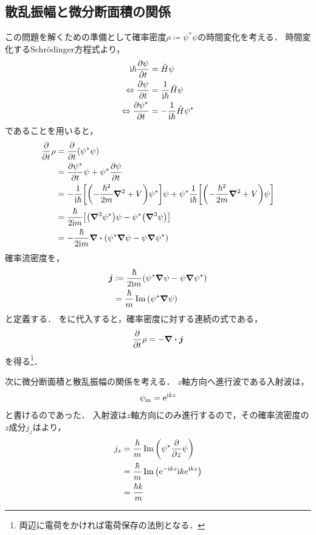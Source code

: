 \documentclass{report}
\begin{document}
  \subsection{散乱振幅と微分断面積の関係}
    この問題を解くための準備として確率密度$\rho \coloneqq \psi^{*} \psi$の時間変化を考える．
    時間変化するSchr\"odinger方程式より，
    \begin{align}
      \mathrm{i}\hbar\pdv{\psi}{t} &= \hat{H}\psi \\ 
      \Leftrightarrow \pdv{\psi}{t} &= \frac{1}{\mathrm{i}\hbar}\hat{H}\psi \\ 
      \Leftrightarrow \pdv{\psi^*}{t} &= -\frac{1}{\mathrm{i}\hbar}\hat{H}\psi^*
    \end{align}
    であることを用いると，
    \begin{align}
      \pdv{t}\rho &= \pdv{t}(\psi^{*}\psi) \\
      &= \pdv{\psi^*}{t}\psi + \psi^{*}\pdv{\psi}{t} \\
      &= -\frac{1}{\mathrm{i}\hbar}\qty[\qty(-\frac{\hbar^2}{2m}\grad^2 + V)\psi^{*}]\psi + \psi^{*}\frac{1}{\mathrm{i}\hbar}\qty[\qty(-\frac{\hbar^2}{2m}\grad^2 + V)\psi] \\
      &= \frac{\hbar}{2\mathrm{i} m}\qty[\qty(\grad^2 \psi^{*})\psi - \psi^{*}\qty(\grad^2\psi)] \\
      &= -\frac{\hbar}{2\mathrm{i} m}\div \qty(\psi^{*}\grad\psi - \psi \grad\psi^{*})\label{prob-density}
    \end{align}
    確率流密度を，
    \begin{align}
      \bm{j} &\coloneqq \frac{\hbar}{2\mathrm{i} m} \qty(\psi^{*}\grad\psi - \psi \grad\psi^{*})\label{prob-flow} \\
      &= \frac{\hbar}{m}\Im \qty(\psi^{*}\grad\psi)
    \end{align}
    と定義する．
    をに代入すると，確率密度に対する連続の式である，
    \begin{align}
      \pdv{t} \rho = -\div\bm{j}
    \end{align}
    を得る\footnote{両辺に電荷をかければ電荷保存の法則となる． }．
    \par
    次に微分断面積と散乱振幅の関係を考える．
    $z$軸方向へ進行波である入射波は，
    \begin{align}
      \psi_{\mathrm{in}} = \mathrm{e}^{\mathrm{i} kz}
    \end{align}
    と書けるのであった．
    入射波は$z$軸方向にのみ進行するので，その確率流密度の$z$成分$j_z$はより，
    \begin{align}
      j_z &= \frac{\hbar}{m}\Im \qty(\psi^{*}\pdv{z}\psi) \\ 
      &= \frac{\hbar}{m} \Im \qty(\mathrm{e}^{-\mathrm{i} kz} \mathrm{i} k e^{\mathrm{i} kz}) \\
      &= \frac{\hbar k}{m}
    \end{align}%
\end{document}
